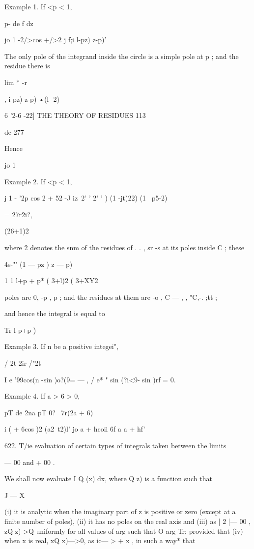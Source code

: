 Example 1. If <p < 1, 

p-  de   f dz 

jo 1 -2/>cos +/>2 j f;i l-pz) z-p)' 

The only pole of the integrand inside the circle is a simple pole at p ; and the residue 
there is 

lim * -r 



, i  pz) z-p)  •(l- 2)  



6 '2-6 -22] THE THEORY OF RESIDUES 113 

de 277 



Hence 



jo 1  



  Example 2. If <p < 1, 

j 1 - '2p cos 2 + 52 -J  iz\ 2' ' 2' ' ) (1 -jt)22) (1 \ p5-2) 

= 27r2i?, 

(26+1)2 

where 2  denotes the snm of the residues of . . ,  sr -s   at its poles inside C ; these 

4s-"' (1 — pz )  z  — p) 

1 1 l+p  + p* ( 3+l)2 ( 3+XY2 

poles are 0, -p , p  ; and the residues at them are  -o ,  C —  , ,   "C,-. ;tt ; 

and hence the integral is equal to 

Tr l-p+p ) 

Example 3. If n be a positive integei", 

/ 2t 2ir /"2t 

I e '99cos(n -sin )o?(9= — , / e* "  sin (?i<9- sin  )rf  = 0. 

Example 4. If a > 6 > 0, 

pT de 2na pT 0?  \  7r(2a + 6) 

i  (  + 6cos )2 (a2\ t2)l' jo  a + hcoii 6f a  a + hf' 

622. T/ie evaluation of certain types of integrals taken between the limits 

— 00 and + 00 . 

We shall now evaluate I Q (x) dx, where Q  z) is a function such that 

J — X 

(i) it is analytic when the imaginary part of z is positive or zero (except at a 
finite number of poles), (ii) it has no poles on the real axis and (iii) as | 2  |—   00 , 
zQ z) >Q uniformly for all values of arg  such that O arg  Tr; provided 
that (iv) when x is real, xQ x)—>0, as ic— > + x , in such a way* that 

